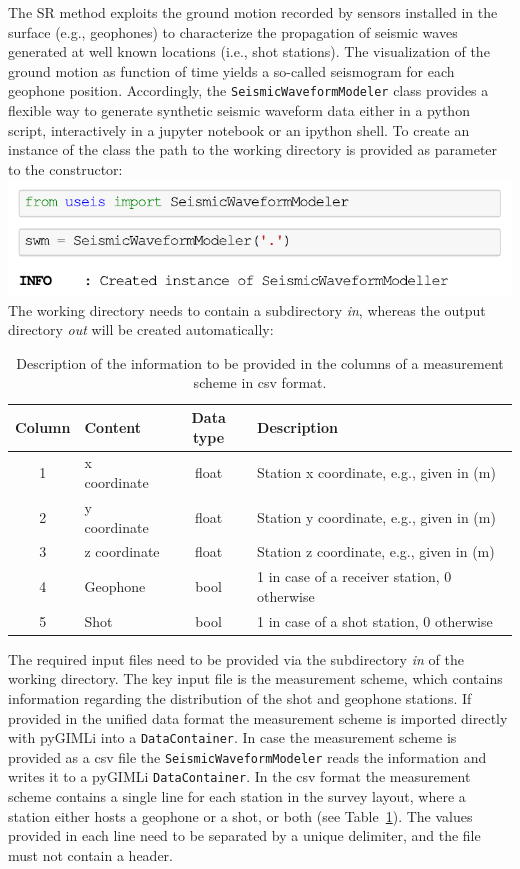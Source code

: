 \documentclass[a4paper,fleqn]{cas-sc}
\begin{document}
The SR method exploits the ground motion recorded by sensors installed in the surface (e.g., geophones) to characterize the propagation of seismic waves generated at well known locations (i.e., shot stations). 
The visualization of the ground motion as function of time yields a so-called seismogram for each geophone position.
Accordingly, the \texttt{SeismicWaveformModeler} class provides a flexible way to generate synthetic seismic waveform data either in a python script, interactively in a jupyter notebook or an ipython shell. To create an instance of the class the path to the working directory is provided as parameter to the constructor:
\newline
\includegraphics[width=.5\textwidth]{./figures/create_swm.pdf}
\newline
\\The working directory needs to contain a subdirectory \textit{in}, whereas the output directory \textit{out} will be created automatically:


\begin{table}[pos=h]
    \caption{Description of the information to be provided in the columns of a measurement scheme in csv format.}
    \centering
    \begin{tabular}{clcl}
        \toprule
        Column & \textbf{Content} & \textbf{Data type} & \textbf{Description} \\
        \midrule
        1 & x coordinate & float & Station x coordinate, e.g., given in (m) \\ 
        2 & y coordinate & float & Station y coordinate, e.g., given in (m) \\ 
        3 & z coordinate & float & Station z coordinate, e.g., given in (m) \\ 
        4 & Geophone & bool & 1 in case of a receiver station, 0 otherwise \\ 
        5 & Shot & bool & 1 in case of a shot station, 0 otherwise \\
        \bottomrule
    \end{tabular}
    \label{tab:scheme}
\end{table}
The required input files need to be provided via the subdirectory \textit{in} of the working directory. The key input file is the measurement scheme, which contains information regarding the distribution of the shot and geophone stations. If provided in the unified data format the measurement scheme is imported directly with pyGIMLi into a \texttt{DataContainer}. In case the measurement scheme is provided as a csv file the \texttt{SeismicWaveformModeler} reads the information and writes it to a pyGIMLi \texttt{DataContainer}. In the csv format the measurement scheme contains a single line for each station in the survey layout, where a station either hosts a geophone or a shot, or both (see Table~\ref{tab:scheme}). The values provided in each line need to be separated by a unique delimiter, and the file must not contain a header.
\end{document}
